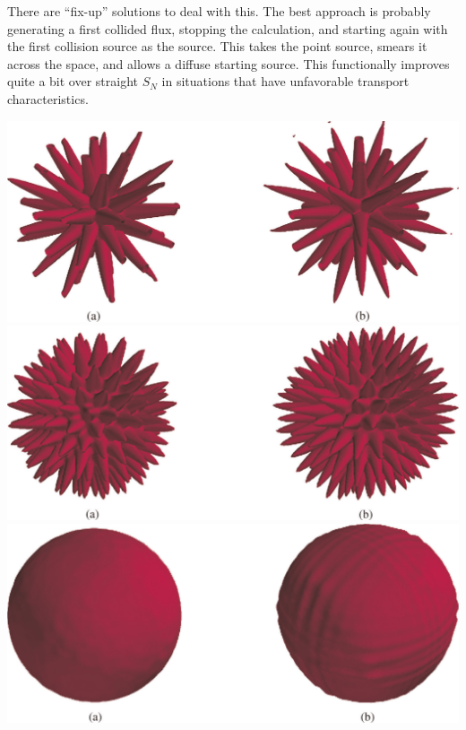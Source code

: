 \documentclass[12pt]{article}
\begin{document}
There are ``fix-up'' solutions to deal with this. The best approach is 
probably generating a first collided flux, stopping the calculation, and 
starting again with the first collision source as the source. This takes the 
point source, smears it across the space, and allows a diffuse starting 
source. This functionally improves quite a bit over straight $S_N$ in 
situations that have unfavorable transport characteristics.

\newpage

\begin{center}
\includegraphics[keepaspectratio, width = \textwidth]{test-001}
\includegraphics[keepaspectratio, width = \textwidth]{test-002}
\includegraphics[keepaspectratio, width = \textwidth]{test-003}
\end{center}

\newpage
\end{document}
